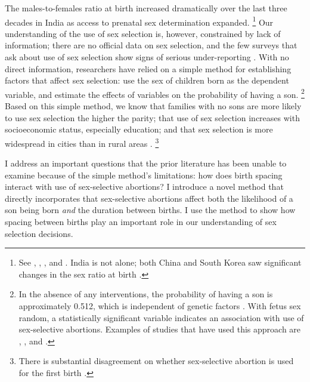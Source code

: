 \documentclass[12pt,letterpaper]{article}
\begin{document}
The males-to-females ratio at birth increased dramatically over the last three 
decades in India as access to prenatal sex determination expanded.%
\footnote{
See \citet{das_gupta97}, \citet{Sudha1999},
\citet{Arnold2002}, \cite{retherford03b} and \citet{jha06}.
India is not alone; both China and South Korea saw
significant changes in the sex ratio at birth \citep{Yi1993,park95}.
}
Our understanding of the use of sex selection is, however, constrained by 
lack of information;
there are no official data on sex selection, and the few surveys that ask about use of 
sex selection show signs of serious under-reporting \citep{goodkind96}.
With no direct information, researchers have relied on a simple method for establishing 
factors that affect sex selection: use the sex of children born as the 
dependent variable, and estimate the effects of variables on the probability of having a son.%
\footnote{
In the absence of any interventions, the probability of having a son
is approximately 0.512, which is independent of genetic factors \citep{ben-porath76b,jacobsen99}.
With fetus sex random, a statistically significant variable indicates an association with 
use of sex-selective abortions.
Examples of studies that have used this approach are \cite{retherford03b},
\cite{jha06}, and \cite{abrevaya09}. 
}
Based on this simple method, we know that families with no sons are more likely to
use sex selection the higher the parity;
that use of sex selection increases with socioeconomic status, especially education;
and that sex selection is more widespread in cities than in rural areas 
\citep{retherford03b,jha06,abrevaya09}.%
\footnote{
There is substantial disagreement on whether sex-selective abortion is used for the 
first birth \citep{retherford03b,jha06}.
}

I address an important questions that the prior literature has been unable
to examine because of the simple method's limitations:
how does birth spacing interact with use of sex-selective abortions?
I introduce a novel method that directly incorporates that sex-selective 
abortions affect both the likelihood of a son being born \emph{and} the duration between 
births.
I use the method to show how spacing between births play an important role in our 
understanding of sex selection decisions.
\end{document}
